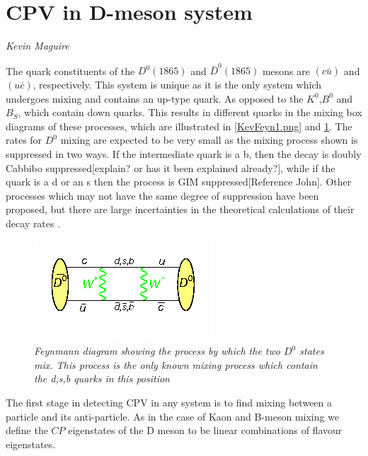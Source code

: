 \section{CPV in D-meson system}
\vspace{-1.0em}
\begin{center}
\tiny{\textit{Kevin Maguire}}
\end{center}

The quark constituents of the $D^{0}(1865)$ and $\bar{D}^{0}(1865)$ mesons are $(c \bar{u})$ and $(u \bar{c})$, respectively. This system is unique as it is the only system which undergoes mixing and contains an up-type quark. As opposed to the $K^{0}$,$B^{0}$ and $B_{S}$, which contain down quarks. This results in different quarks in the mixing box diagrams of these processes, which are illustrated in \cref{KevFeyn1.png} and \cref{Deon_Mixing_Feyn}. The rates for $D^0$ mixing are expected to be very small as the mixing process shown is suppressed in two ways. If the intermediate quark is a b, then the decay is doubly Cabbibo suppressed[explain? or has it been explained already?], while if the quark is a d or an s then the process is GIM suppressed[Reference John]. Other processes which may not have the same degree of suppression have been proposed, but there are large incertainties in the theoretical calculations of their decay rates \cite{Babar_D0_Review}.    

\begin{figure}[h!]
\begin{center}
\includegraphics[scale=0.8]{figs/Deon_mixing_feyn.png}
\end{center}
\caption{\textit{Feynmann diagram showing the process by which the two $D^{0}$ states mix. This process is the only known mixing process which contain the d,s,b quarks in this position \cite{Deon_Mixing_Feyn}}}
\label{Deon_Mixing_Feyn}
\end{figure}

The first stage in detecting CPV in any system is to find mixing between a particle and its anti-particle. As in the case of Kaon and B-meson mixing we define the $CP$ eigenstates of the D meson to be linear combinations of flavour eigenstates.

